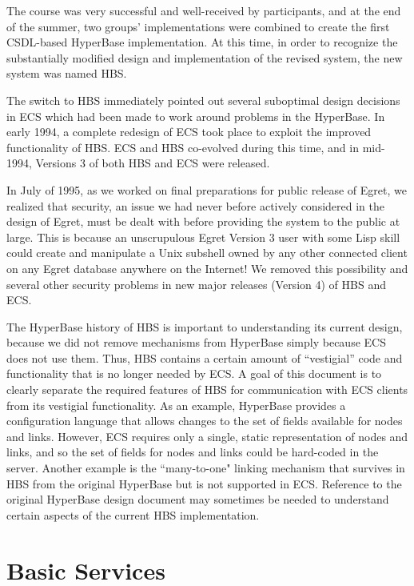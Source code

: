 The course was very successful and well-received by participants, and at
the end of the summer, two groups' implementations were combined to create
the first CSDL-based HyperBase implementation.  At this time, in order to
recognize the substantially modified design and implementation of the
revised system, the new system was named HBS.

The switch to HBS immediately pointed out several suboptimal design
decisions in ECS which had been made to work around problems in the
HyperBase.  In early 1994, a complete redesign of ECS took place to exploit
the improved functionality of HBS.  ECS and HBS co-evolved during this
time, and in mid-1994, Versions 3 of both HBS and ECS were released.

In July of 1995, as we worked on final preparations for public
release of Egret, we realized that security, an issue we had never
before actively considered in the design of Egret, must be dealt with 
before providing the system to the public at large.  This is 
because an unscrupulous Egret Version 3 user with some Lisp skill could
create and manipulate a Unix subshell owned by any other 
connected client on any Egret database anywhere on the Internet!
We removed this possibility and several other security problems
in new major releases (Version 4) of HBS and ECS.

The HyperBase history of HBS is important to understanding its current
design, because we did not remove mechanisms from HyperBase simply
because ECS does not use them. Thus, HBS contains a certain amount of
``vestigial'' code and functionality that is no longer needed by ECS. A
goal of this document is to clearly separate the required features of HBS 
for communication with ECS clients from its vestigial functionality.
As an example, HyperBase provides a
configuration language that allows changes to the set of fields available
for nodes and links.  However, ECS requires only a single, static representation of nodes
and links, and so the set of fields for nodes and links could be hard-coded
in the server.  Another example is the ``many-to-one" linking mechanism that
survives in HBS from the original HyperBase but is not supported in ECS.
Reference to the original HyperBase design document \cite{Wiil90a} may sometimes be needed to
understand certain aspects of the current HBS implementation.

\section{Basic Services}

